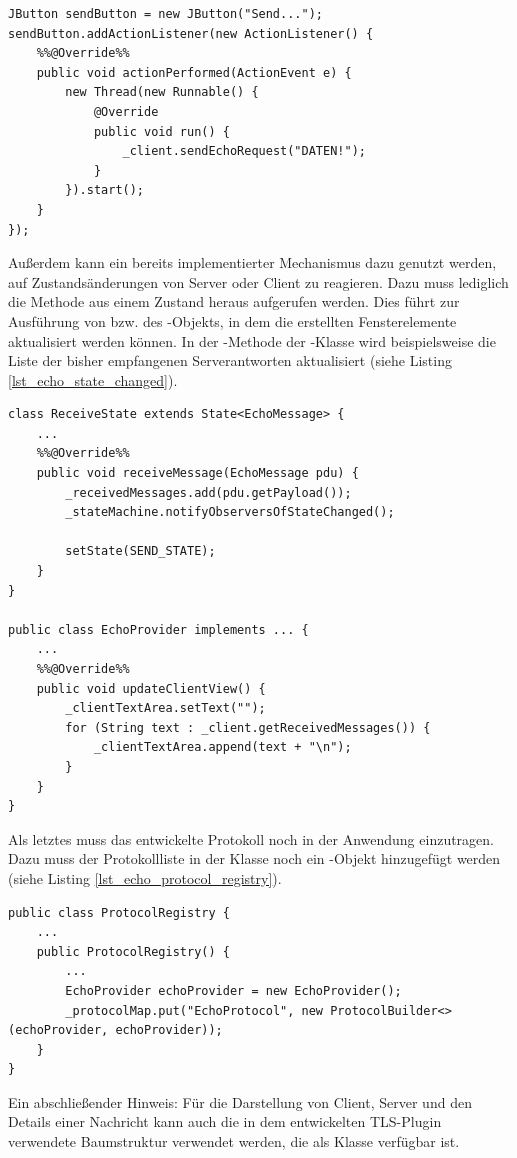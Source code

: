 \begin{lstlisting}
JButton sendButton = new JButton("Send...");
sendButton.addActionListener(new ActionListener() {
	%%@Override%%
	public void actionPerformed(ActionEvent e) {
		new Thread(new Runnable() {
			@Override
			public void run() {
				_client.sendEchoRequest("DATEN!");
			}
		}).start();
	}
});
\end{lstlisting}

Außerdem kann ein bereits implementierter Mechanismus dazu genutzt werden, auf Zustandsänderungen von Server oder Client zu reagieren. Dazu muss lediglich die Methode  aus einem Zustand heraus aufgerufen werden. Dies führt zur Ausführung von  bzw.  des -Objekts, in dem die erstellten Fensterelemente aktualisiert werden können. In der -Methode der -Klasse wird beispielsweise die Liste der bisher empfangenen Serverantworten aktualisiert (siehe Listing \ref{lst_echo_state_changed}).

\begin{lstlisting}[style=java, caption=Aktualisierungsmechanismus bei Zustandsänderung, label=lst_echo_state_changed]
class ReceiveState extends State<EchoMessage> {
	...
	%%@Override%%
	public void receiveMessage(EchoMessage pdu) {
		_receivedMessages.add(pdu.getPayload());
		_stateMachine.notifyObserversOfStateChanged();

		setState(SEND_STATE);
	}
}

public class EchoProvider implements ... {
	...
	%%@Override%%
	public void updateClientView() {
		_clientTextArea.setText("");
		for (String text : _client.getReceivedMessages()) {
			_clientTextArea.append(text + "\n");
		}
	}
}
\end{lstlisting}

Als letztes muss das entwickelte Protokoll noch in der Anwendung einzutragen. Dazu muss der Protokollliste in der Klasse  noch ein -Objekt hinzugefügt werden (siehe Listing \ref{lst_echo_protocol_registry}).

\begin{lstlisting}[style=java, caption=Protokollregistrierung, label=lst_echo_protocol_registry]
public class ProtocolRegistry {
	...
	public ProtocolRegistry() {
		...
		EchoProvider echoProvider = new EchoProvider();
		_protocolMap.put("EchoProtocol", new ProtocolBuilder<>(echoProvider, echoProvider));
	}	
}
\end{lstlisting}

Ein abschließender Hinweis: Für die Darstellung von Client, Server und den Details einer Nachricht kann auch die in dem entwickelten TLS-Plugin verwendete Baumstruktur verwendet werden, die als Klasse  verfügbar ist.
